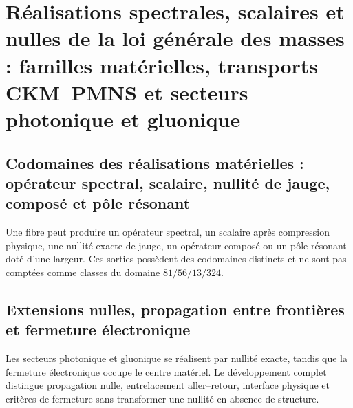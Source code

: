 \chapter{Réalisations spectrales, scalaires et nulles de la loi générale des masses : familles matérielles, transports CKM–PMNS et secteurs photonique et gluonique}
\label{chap:realizaciones-familias-mezclas-masas}

\section{Codomaines des réalisations matérielles : opérateur spectral, scalaire, nullité de jauge, composé et pôle résonant}
Une fibre peut produire un opérateur spectral, un scalaire après compression physique, une nullité exacte de jauge, un opérateur composé ou un pôle résonant doté d’une largeur. Ces sorties possèdent des codomaines distincts et ne sont pas comptées comme classes du domaine \(81/56/13/324\).

\section{Extensions nulles, propagation entre frontières et fermeture électronique}

Les secteurs photonique et gluonique se réalisent par nullité exacte, tandis que la fermeture électronique occupe le centre matériel. Le développement complet distingue propagation nulle, entrelacement aller--retour, interface physique et critères de fermeture sans transformer une nullité en absence de structure.

\begingroup
\let\chapter\section
\let\section\subsection
\let\subsection\subsubsection
\let\subsubsection\paragraph
\let\clearpage\relax
\let\cleardoublepage\relax

\endgroup

